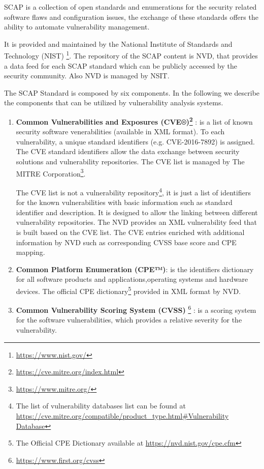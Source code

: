 \documentclass{llncs}
\begin{document}
\par SCAP is a collection of open standards and enumerations for the security related software flaws and configuration issues, the exchange of these standards offers the ability to automate vulnerability management\cite{scap_doc}. \par   
 It is provided and maintained by the National Institute of Standards and Technology (NIST) \footnote{\url{https://www.nist.gov/}}. The repository of the SCAP content is NVD, that provides a data feed for each SCAP standard which can be publicly accessed by the security community. Also NVD is managed by NSIT.
 
 The SCAP Standard is composed by six components. In the following we describe the components that can be utilized by vulnerability analysis systems.
 
 \begin{enumerate}
 \item \textbf{Common Vulnerabilities and Exposures (CVE®)\footnote{\url{https://cve.mitre.org/index.html}}} : is a list of known security software venerabilities (available in XML format). To each vulnerability, a unique standard identifiers (e.g. CVE-2016-7892) is assigned. The CVE standard identifiers allow the data exchange between security solutions and vulnerability repositories. The CVE list is managed by The MITRE Corporation\footnote{\url{https://www.mitre.org/}}.

 The CVE list is not a vulnerability repository\footnote{The list of vulnerability databases list can be found at \url{https://cve.mitre.org/compatible/product_type.html\#Vulnerability Database}}, it is just a list of identifiers for the known vulnerabilities with basic information such as standard identifier and description. It is designed to allow the linking between different vulnerability repositories. The NVD provides an XML vulnerability feed that is built based on the CVE list. The CVE entries enriched with additional information by NVD such as corresponding CVSS base score and CPE mapping.    
 
 \item \textbf{Common Platform Enumeration (CPE™)}: is the identifiers dictionary for all software products and applications,operating systems and hardware devices. The official CPE dictionary\footnote{The Official CPE Dictionary available at \url{https://nvd.nist.gov/cpe.cfm}} provided in XML format by NVD.
  
 \item \textbf{Common Vulnerability Scoring System (CVSS)} \footnote{\url{https://www.first.org/cvss}} : is a scoring system for the software  vulnerabilities, which provides a relative severity for the vulnerability.
 \end{enumerate}
\end{document}

